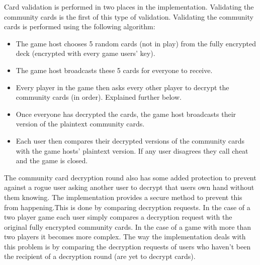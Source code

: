 \documentclass[11pt, oneside]{article}   	%
\begin{document}
Card validation is performed in two places in the implementation. Validating the community cards is the first of this type of validation. Validating the community cards is performed using the following algorithm:

\begin{itemize}
\renewcommand{\labelitemi}{$\bullet$}
\item The game host chooses 5 random cards (not in play) from the fully encrypted deck (encrypted with every game users’ key).
\item The game host broadcasts these 5 cards for everyone to receive.
\item Every player in the game then asks every other player to decrypt the community cards (in order). Explained further below.
\item Once everyone has decrypted the cards, the game host broadcasts their version of the plaintext community cards.
\item Each user then compares their decrypted versions of the community cards with the game hosts’ plaintext version. If any user disagrees they call cheat and the game is closed.
\end{itemize}

The community card decryption round also has some added protection to prevent against a rogue user asking another user to decrypt that users own hand without them knowing. The implementation provides a secure method to prevent this from happening.This is done by comparing decryption requests. In the case of a two player game each user simply compares a decryption request with the original fully encrypted community cards. In the case of a game with more than two players it becomes more complex. The way the implementation deals with this problem is by comparing the decryption requests of users who haven't been the recipient of a decryption round (are yet to decrypt cards).\\
\end{document}
